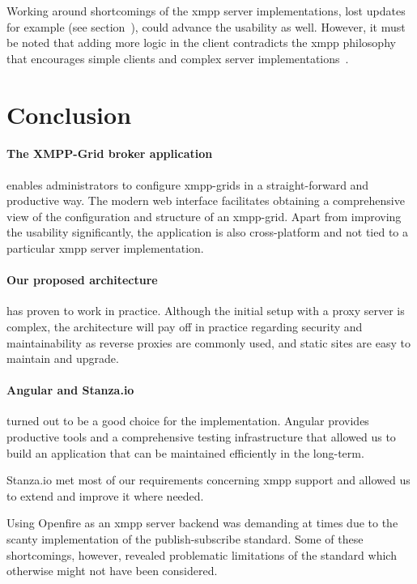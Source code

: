Working around shortcomings of the \gls{xmpp} server implementations, lost updates for example (see section~), could advance the usability as well.
However, it must be noted that adding more logic in the client contradicts the \gls{xmpp} philosophy that encourages simple clients and complex server implementations~\cite{definitive-guide-xmpp}.

\section{Conclusion}
\paragraph{The XMPP-Grid broker application} enables administrators to configure \glspl{xmpp-grid} in a straight-forward and productive way.
The modern web interface facilitates obtaining a comprehensive view of the configuration and structure of an \gls{xmpp-grid}.
Apart from improving the usability significantly, the application is also cross-platform and not tied to a particular \gls{xmpp} server implementation.

\paragraph{Our proposed architecture} has proven to work in practice.
Although the initial setup with a proxy server is complex, the architecture will pay off in practice regarding security and maintainability as reverse proxies are commonly used, and static sites are easy to maintain and upgrade.

\paragraph{Angular and Stanza.io} turned out to be a good choice for the implementation.
Angular provides productive tools and a comprehensive testing infrastructure that allowed us to build an application that can be maintained efficiently in the long-term.

Stanza.io met most of our requirements concerning \gls{xmpp} support and allowed us to extend and improve it where needed.

Using Openfire as an \gls{xmpp} server backend was demanding at times due to the scanty implementation of the \gls{publish-subscribe} standard.
Some of these shortcomings, however, revealed problematic limitations of the standard which otherwise might not have been considered.

